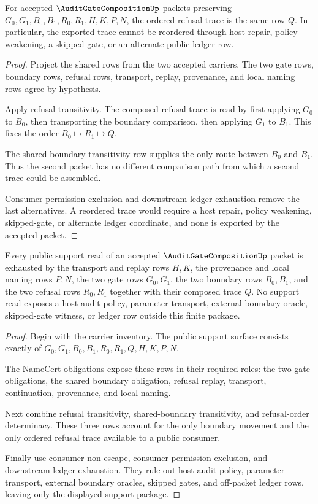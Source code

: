 \begin{theorem}
\label{thm:audit-gate-composition-refusal-order-determinacy}
For accepted $\AuditGateCompositionUp$ packets preserving
$G_0,G_1,B_0,B_1,R_0,R_1,H,K,P,N$, the ordered refusal trace is the same row
$Q$. In particular, the exported trace cannot be reordered through host repair,
policy weakening, a skipped gate, or an alternate public ledger row.
\end{theorem}
\begin{proof}
Project the shared rows from the two accepted carriers. The two gate rows,
boundary rows, refusal rows, transport, replay, provenance, and local naming
rows agree by hypothesis.

Apply refusal transitivity. The composed refusal trace is read by first applying
$G_0$ to $B_0$, then transporting the boundary comparison, then applying $G_1$
to $B_1$. This fixes the order $R_0 \longmapsto R_1 \longmapsto Q$.

The shared-boundary transitivity row supplies the only route between $B_0$ and
$B_1$. Thus the second packet has no different comparison path from which a
second trace could be assembled.

Consumer-permission exclusion and downstream ledger exhaustion remove the last
alternatives. A reordered trace would require a host repair, policy weakening,
skipped-gate, or alternate ledger coordinate, and none is exported by the
accepted packet.
\end{proof}

\begin{theorem}
\label{thm:audit-gate-composition-support-row-exhaustion}
Every public support read of an accepted $\AuditGateCompositionUp$ packet is
exhausted by the transport and replay rows $H,K$, the provenance and local
naming rows $P,N$, the two gate rows $G_0,G_1$, the two boundary rows
$B_0,B_1$, and the two refusal rows $R_0,R_1$ together with their composed
trace $Q$. No support read exposes a host audit policy, parameter transport,
external boundary oracle, skipped-gate witness, or ledger row outside this
finite package.
\end{theorem}
\begin{proof}
Begin with the carrier inventory. The public support surface consists exactly
of $G_0,G_1,B_0,B_1,R_0,R_1,Q,H,K,P,N$.

The NameCert obligations expose these rows in their required roles: the two
gate obligations, the shared boundary obligation, refusal replay, transport,
continuation, provenance, and local naming.

Next combine refusal transitivity, shared-boundary transitivity, and
refusal-order determinacy. These three rows account for the only boundary
movement and the only ordered refusal trace available to a public consumer.

Finally use consumer non-escape, consumer-permission exclusion, and downstream
ledger exhaustion. They rule out host audit policy, parameter transport,
external boundary oracles, skipped gates, and off-packet ledger rows, leaving
only the displayed support package.
\end{proof}

